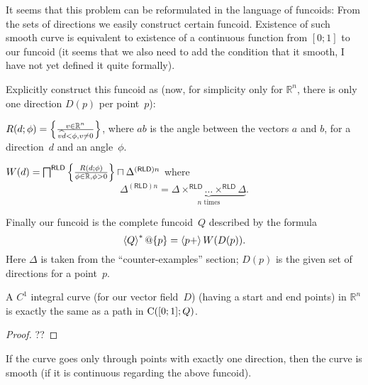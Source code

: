 It seems that this problem can be reformulated in the language of funcoids: From the sets of directions we easily construct certain funcoid.
Existence of such smooth curve is equivalent to existence of a continuous function from $[0;1]$ to our funcoid (it seems that we also need to add the
condition that it smooth, I have not yet defined it quite formally).

Explicitly construct this funcoid as (now, for simplicity only for $\mathbb{R}^n$, there is only one direction $D(p)$ per point~$p$):

$R(d;\phi) = \left\{ \frac{v\in\mathbb{R}^n}{\widehat{vd}<\phi, v\ne 0}\right\}$,
where $\widehat{ab}$ is the angle between the vectors $a$ and $b$,
for a direction~$d$ and an angle~$\phi$.

$W(d) = \bigsqcap^{\mathsf{RLD}}\left\{ \frac{R(d;\phi)}{\phi\in\mathbb{R},\phi>0}\right\} \sqcap \Delta^{(\mathsf{RLD})n}$
where \[ \Delta^{(\mathsf{RLD})n} = \underbrace{\Delta\times^{\mathsf{RLD}}\dots\times^{\mathsf{RLD}}\Delta}_{n\text{ times}}. \]

Finally our funcoid is the complete funcoid~$Q$ described by the formula
\[ \left\langle Q\right\rangle ^{\ast}@\{p\} = \left\langle p+\right\rangle W(D(p)). \]
Here $\Delta$ is taken from the ``counter-examples'' section;
$D(p)$ is the given set of directions for a point~$p$.


\begin{thm}
A $C^1$ integral curve (for our vector field~$D$) (having a start and end points) in $\mathbb{R}^n$ is exactly the same as a path in $\mathrm{C}([0;1]; Q)$.
\end{thm}

\begin{proof}
??
\end{proof}

\begin{conjecture}
If the curve goes only through points with exactly one direction, then the curve is smooth (if it is continuous regarding the above funcoid).
\end{conjecture}


